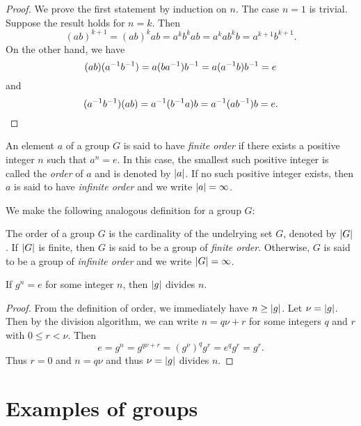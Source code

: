 \begin{proof}
    We prove the first statement by induction on \(n\). The case \(n = 1\) is
    trivial. Suppose the result holds for \(n = k\). Then
    \[
        (ab)^{k + 1} = (ab)^k ab = a^k b^k ab = a^k a b^k b = a^{k + 1} b^{k + 1}.
    \]
    On the other hand, we have
    \[
        (ab)(a^{-1} b^{-1}) = a(ba^{-1})b^{-1} = a(a^{-1} b)b^{-1} = e
    \]
    and
    \[
        (a^{-1} b^{-1})(ab) = a^{-1}(b^{-1} a)b = a^{-1}(a b^{-1})b = e.
    \]
\end{proof}

\begin{definition}
    An element \(a\) of a group \(G\) is said to have \emph{finite order} if
    there exists a positive integer \(n\) such that \(a^n = e\). In this case,
    the smallest such positive integer is called the \emph{order} of \(a\) and
    is denoted by \(\lvert a \rvert\). If no such positive integer exists, then \(a\)
    is said to have \emph{infinite order} and we write \(\lvert a \rvert = \infty\).
\end{definition}

We make the following analogous definition for a group \(G\):

\begin{definition}
    The order of a group \(G\) is the cardinality of the undelrying set \(G\),
    denoted by \(\lvert G \rvert\). If \(\lvert G \rvert\) is finite, then \(G\) is said to
    be a group of \emph{finite order}. Otherwise, \(G\) is said to be a group of
    \emph{infinite order} and we write \(\lvert G \rvert = \infty\).
\end{definition}

\begin{theorem}
    If \(g^n = e\) for some integer \(n\), then \(\lvert g \rvert\) divides \(n\).
\end{theorem}

\begin{proof}
    From the definition of order, we immediately have \(n \geq \lvert g \rvert\). Let
    \(\nu = \lvert g \rvert\). Then by the division algorithm, we can write \(n = q\nu
    + r\) for some integers \(q\) and \(r\) with \(0 \leq r < \nu\). Then
    \[
        e = g^n = g^{q\nu + r} = (g^\nu)^q g^r = e^q g^r = g^r.
    \]
    Thus \(r = 0\) and \(n = q\nu\) and thus \(\nu = \lvert g \rvert\) divides \(n\).
\end{proof}


\section{Examples of groups}

